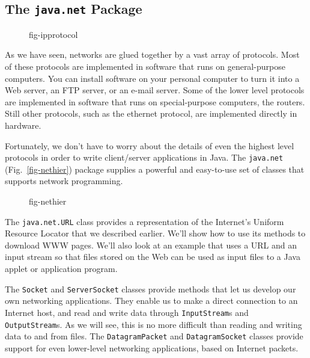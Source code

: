 \subsection{The {\tt java.net} Package}

\begin{figure}[tb]
{fig-ipprotocol}
\end{figure}

\noindent As we have seen, networks are glued together by a vast array of
protocols.   Most of these protocols are implemented in software that
runs on general-purpose computers.   You can install software on your
personal computer to turn it into a Web server, an FTP server, or an
e-mail server.  Some of the lower level protocols are implemented in
software that runs on special-purpose computers, the routers.  Still
other protocols, such as the ethernet protocol, are implemented
directly in hardware.

Fortunately, we don't have to worry about the details of even the
highest level protocols in order to write client/server applications
in Java.   The {\tt java.net} (Fig.~\ref{fig-nethier}) package
supplies a powerful and easy-to-use set of classes that supports
network programming.

\begin{figure}[h]
 {fig-nethier}
\end{figure}

The {\tt java.net.URL} class provides a representation of the
Internet's Uniform Resource Locator that we described earlier.  We'll
show how to use its methods to download WWW pages.  We'll also
look at an example that uses a URL and an input stream so that
files stored on the Web can be used as input files to a Java applet
or application program.

The {\tt Socket} and {\tt ServerSocket} classes provide methods that
let us develop our own networking applications.  They enable us to
make a direct connection to an Internet host, and read and write data
through \mbox{\tt InputStream}s and {\tt OutputStream}s.  As we will see,
this is no more difficult than reading and writing data to and from
files.  The {\tt DatagramPacket} and {\tt DatagramSocket} classes
provide support for even lower-level networking applications, based on
Internet packets.

